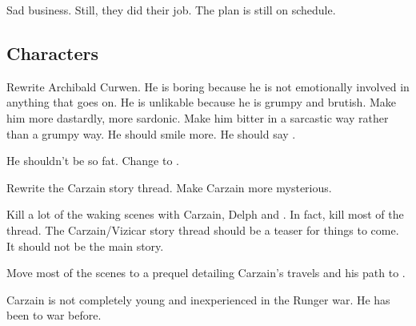 \begin{garbage}
\begin{changes}
\begin{itemize}
\begin{prose}
{            Sad business. 
            Still, they did their job. 
            The plan is still on schedule.}
        \end{prose}
    \end{itemize}
\end{changes}









\subsection{Characters}
\begin{changes}
  \begin{comment}\paragraph{Archibald Curwen}\end{comment}
    Rewrite Archibald Curwen. 
    He is boring because he is not emotionally involved in anything that goes on. 
    He is unlikable because he is grumpy and brutish. 
    Make him more dastardly, more sardonic. 
    Make him bitter in a sarcastic way rather than a grumpy way. 
    He should smile more. 
    He should say \quo{\Mister{} \Shireyo}. 
    
    He shouldn't be so fat. 
    Change  to . 
  
  \begin{comment}
  \paragraph{Carzain}
  \end{comment}
    Rewrite the Carzain story thread. 
    Make Carzain more mysterious. 
    
    Kill a lot of the waking scenes with Carzain, Delph and \Tsekkect. 
    In fact, kill most of the thread. 
    The Carzain/Vizicar story thread should be a teaser for things to come.
    It should not be the main story. 
    
    Move most of the scenes to a prequel detailing Carzain's travels and his path to \kenosis. 
    
    Carzain is not completely young and inexperienced in the Runger war. 
    He has been to war before. 
    

\end{changes}
\end{garbage}
